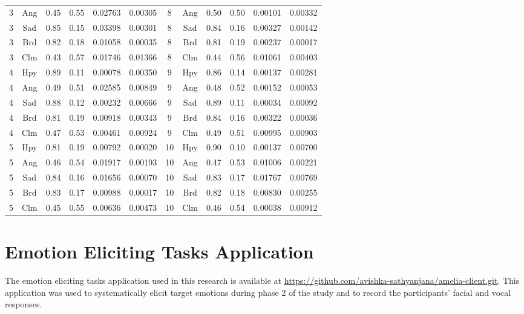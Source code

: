 \begin{table}[H]
\begin{tabular}{|c|c|c|c|c|c||c|c|c|c|c|c|}
    3 & Ang & 0.45 & 0.55 & 0.02763 & 0.00305 & 8 & Ang & 0.50 & 0.50 & 0.00101 & 0.00332 \\
    3 & Sad & 0.85 & 0.15 & 0.03398 & 0.00301 & 8 & Sad & 0.84 & 0.16 & 0.00327 & 0.00142 \\
    3 & Brd & 0.82 & 0.18 & 0.01058 & 0.00035 & 8 & Brd & 0.81 & 0.19 & 0.00237 & 0.00017 \\
    3 & Clm & 0.43 & 0.57 & 0.01746 & 0.01366 & 8 & Clm & 0.44 & 0.56 & 0.01061 & 0.00403 \\
    \hline
    4 & Hpy & 0.89 & 0.11 & 0.00078 & 0.00350 & 9 & Hpy & 0.86 & 0.14 & 0.00137 & 0.00281 \\
    4 & Ang & 0.49 & 0.51 & 0.02585 & 0.00849 & 9 & Ang & 0.48 & 0.52 & 0.00152 & 0.00053 \\
    4 & Sad & 0.88 & 0.12 & 0.00232 & 0.00666 & 9 & Sad & 0.89 & 0.11 & 0.00034 & 0.00092 \\
    4 & Brd & 0.81 & 0.19 & 0.00918 & 0.00343 & 9 & Brd & 0.84 & 0.16 & 0.00322 & 0.00036 \\
    4 & Clm & 0.47 & 0.53 & 0.00461 & 0.00924 & 9 & Clm & 0.49 & 0.51 & 0.00995 & 0.00903 \\
    \hline
    5 & Hpy & 0.81 & 0.19 & 0.00792 & 0.00020 & 10 & Hpy & 0.90 & 0.10 & 0.00137 & 0.00700 \\
    5 & Ang & 0.46 & 0.54 & 0.01917 & 0.00193 & 10 & Ang & 0.47 & 0.53 & 0.01006 & 0.00221 \\
    5 & Sad & 0.84 & 0.16 & 0.01656 & 0.00070 & 10 & Sad & 0.83 & 0.17 & 0.01767 & 0.00769 \\
    5 & Brd & 0.83 & 0.17 & 0.00988 & 0.00017 & 10 & Brd & 0.82 & 0.18 & 0.00830 & 0.00255 \\
    5 & Clm & 0.45 & 0.55 & 0.00636 & 0.00473 & 10 & Clm & 0.46 & 0.54 & 0.00038 & 0.00912 \\
    \hline
    \end{tabular}
\end{table}

\section*{Emotion Eliciting Tasks Application}
\label{app:emotion-application}

The emotion eliciting tasks application used in this research is available at \url{https://github.com/avishka-sathyanjana/amelia-client.git}. This application was used to systematically elicit target emotions during phase 2 of the study and to record the participants' facial and vocal responses.